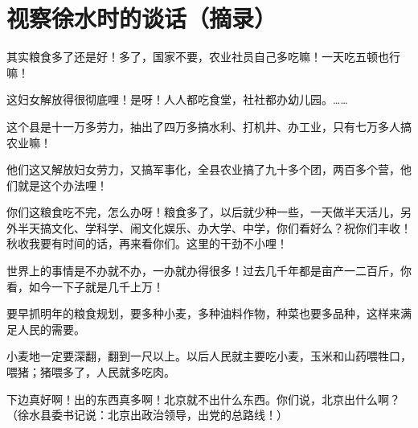 \section[视察徐水时的谈话（摘录）（一九五八年八月四日）]{视察徐水时的谈话（摘录）}


其实粮食多了还是好！多了，国家不要，农业社员自己多吃嘛！一天吃五顿也行嘛！

这妇女解放得很彻底哩！是呀！人人都吃食堂，社社都办幼儿园。……

这个县是十一万多劳力，抽出了四万多搞水利、打机井、办工业，只有七万多人搞农业嘛！

他们这又解放妇女劳力，又搞军事化，全县农业搞了九十多个团，两百多个营，他们就是这个办法哩！

你们这粮食吃不完，怎么办呀！粮食多了，以后就少种一些，一天做半天活儿，另外半天搞文化、学科学、闹文化娱乐、办大学、中学，你们看好么？祝你们丰收！秋收我要有时间的话，再来看你们。这里的干劲不小哩！

世界上的事情是不办就不办，一办就办得很多！过去几千年都是亩产一二百斤，你看，如今一下子就是几千上万！

要早抓明年的粮食规划，要多种小麦，多种油料作物，种菜也要多品种，这样来满足人民的需要。

小麦地一定要深翻，翻到一尺以上。以后人民就主要吃小麦，玉米和山药喂牲口，喂猪；猪喂多了，人民就多吃肉。

下边真好啊！出的东西真多啊！北京就不出什么东西。你们说，北京出什么啊？（徐水县委书记说：北京出政治领导，出党的总路线！）


